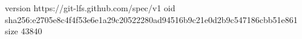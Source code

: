 version https://git-lfs.github.com/spec/v1
oid sha256:e2705e8c4f4f53e6e1a29c20522280ad94516b9c21e0d2b9c547186cbb51e861
size 43840

